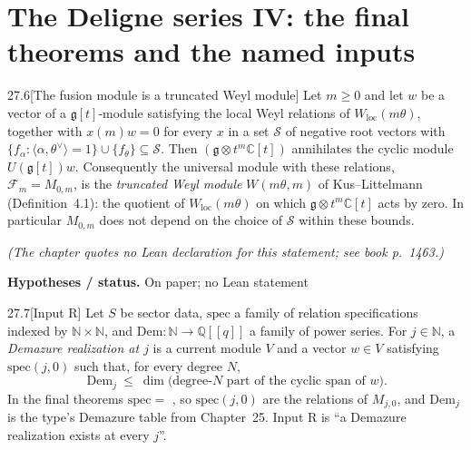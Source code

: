 \documentclass[11pt,openany]{book}
\newcommand{\lean}[1]{\texttt{\detokenize{#1}}}
\theoremstyle{definition}
\theoremstyle{plain}
\newcommand{\C}{{\mathbb{C}}}
\newcommand{\Q}{{\mathbb{Q}}}
\newcommand{\N}{{\mathbb{N}}}
\begin{document}
\chapter[The Deligne series IV: final theorems and named inputs]{The Deligne series IV: the final theorems and the named inputs}
\begingroup
\providecommand{\ltwentyseveng}{\mathfrak g}
\providecommand{\ltwentysevenIns}{I_2^{\mathrm{ns}}}
\providecommand{\ltwentysevenHilb}{\operatorname{Hilb}}
\providecommand{\ltwentysevenvac}{\mathbf 1}
\providecommand{\ltwentysevenJ}{J_\infty}
\providecommand{\ltwentysevenF}{\mathcal F}
\providecommand{\ltwentysevengr}{\operatorname{gr}}
\providecommand{\ltwentysevendg}{d_{\mathfrak g}}
\par\medskip
\begin{blemma}{27.6}[The fusion module is a truncated Weyl module]
Let $m\ge0$ and let $w$ be a vector of a $\ltwentyseveng[t]$-module satisfying the local Weyl relations of
$W_{\mathrm{loc}}(m\theta)$, together with $x(m)w=0$ for every $x$ in a set $\mathcal S$ of negative root vectors with
$\{f_\alpha:\langle\alpha,\theta^\vee\rangle=1\}\cup\{f_\theta\}\subseteq\mathcal S$. Then $(\ltwentyseveng\otimes t^m\C[t])$
annihilates the cyclic module $U(\ltwentyseveng[t])w$. Consequently the universal module with these relations,
$\ltwentysevenF_m=M_{0,m}$, is the \emph{truncated Weyl module} $W(m\theta,m)$ of Kus--Littelmann (Definition~4.1): the
quotient of $W_{\mathrm{loc}}(m\theta)$ on which $\ltwentyseveng\otimes t^m\C[t]$ acts by zero. In particular $M_{0,m}$ does not
depend on the choice of $\mathcal S$ within these bounds.
\end{blemma}
\noindent\emph{(The chapter quotes no Lean declaration for this statement; see book p.~1463.)}\par
\noindent\textbf{Hypotheses / status.} On paper; no Lean statement\par
\medskip
\begin{bdefinition}{27.7}[Input R]
Let $S$ be sector data, $\mathrm{spec}$ a family of relation specifications indexed by $\N\times\N$, and
$\mathrm{Dem}:\N\to\Q[[q]]$ a family of power series. For $j\in\N$, a \emph{Demazure realization at $j$} is a current module
$V$ and a vector $w\in V$ satisfying $\mathrm{spec}(j,0)$ such that, for every degree $N$,
\begin{equation*}
[q^N]\,\mathrm{Dem}_j\ \le\ \dim\bigl(\text{degree-}N\text{ part of the cyclic span of }w\bigr).
\end{equation*}
In the final theorems $\mathrm{spec}=$ \lean{ravFam S}, so $\mathrm{spec}(j,0)$ are the relations of $M_{j,0}$, and $\mathrm{Dem}_j$
is the type's Demazure table from Chapter~25. Input R is ``a Demazure realization exists at every $j$''.
\end{bdefinition}
\end{document}
